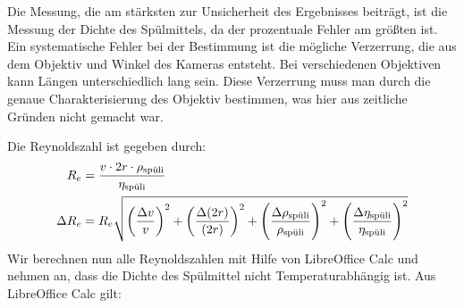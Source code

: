 		Die Messung, die am stärksten zur Unsicherheit des Ergebnisses beiträgt, ist die Messung der Dichte des Spülmittels, da der prozentuale Fehler am größten ist. Ein systematische Fehler bei der Bestimmung ist die mögliche Verzerrung, die aus dem Objektiv und Winkel des Kameras entsteht. Bei verschiedenen Objektiven kann Längen unterschiedlich lang sein. Diese Verzerrung muss man durch die genaue Charakterisierung des Objektiv bestimmen, was hier aus zeitliche Gründen nicht gemacht war. 

		Die Reynoldszahl ist gegeben durch:
		\begin{align}
			R_e &= \frac{v\cdot 2r \cdot \rho_\spuli}{\eta_\spuli} \\
			\Delta R_e &= R_e \relquad{v, (2r), \rho_\spuli, \eta_\spuli}
		\end{align}
		Wir berechnen nun alle Reynoldszahlen mit Hilfe von LibreOffice Calc und nehmen an, dass die Dichte des Spülmittel nicht Temperaturabhängig ist. 
		\newpage
		Aus LibreOffice Calc gilt:

